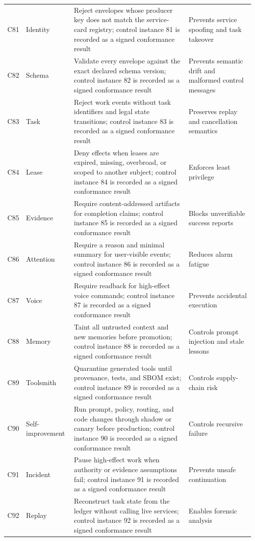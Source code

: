 \documentclass[10pt,journal,onecolumn]{IEEEtran}
\begin{document}
\begin{longtable}{P{0.06\textwidth} P{0.14\textwidth} P{0.48\textwidth} P{0.24\textwidth}}
C81 & Identity & Reject envelopes whose producer key does not match the service-card registry; control instance 81 is recorded as a signed conformance result & Prevents service spoofing and task takeover \\
C82 & Schema & Validate every envelope against the exact declared schema version; control instance 82 is recorded as a signed conformance result & Prevents semantic drift and malformed control messages \\
C83 & Task & Reject work events without task identifiers and legal state transitions; control instance 83 is recorded as a signed conformance result & Preserves replay and cancellation semantics \\
C84 & Lease & Deny effects when leases are expired, missing, overbroad, or scoped to another subject; control instance 84 is recorded as a signed conformance result & Enforces least privilege \\
C85 & Evidence & Require content-addressed artifacts for completion claims; control instance 85 is recorded as a signed conformance result & Blocks unverifiable success reports \\
C86 & Attention & Require a reason and minimal summary for user-visible events; control instance 86 is recorded as a signed conformance result & Reduces alarm fatigue \\
C87 & Voice & Require readback for high-effect voice commands; control instance 87 is recorded as a signed conformance result & Prevents accidental execution \\
C88 & Memory & Taint all untrusted context and new memories before promotion; control instance 88 is recorded as a signed conformance result & Controls prompt injection and stale lessons \\
C89 & Toolsmith & Quarantine generated tools until provenance, tests, and SBOM exist; control instance 89 is recorded as a signed conformance result & Controls supply-chain risk \\
C90 & Self-improvement & Run prompt, policy, routing, and code changes through shadow or canary before production; control instance 90 is recorded as a signed conformance result & Controls recursive failure \\
C91 & Incident & Pause high-effect work when authority or evidence assumptions fail; control instance 91 is recorded as a signed conformance result & Prevents unsafe continuation \\
C92 & Replay & Reconstruct task state from the ledger without calling live services; control instance 92 is recorded as a signed conformance result & Enables forensic analysis \\

\end{longtable}
\end{document}
